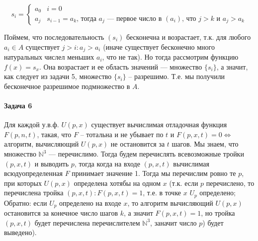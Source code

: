 \documentclass{article}
\newcommand{\andi}{$ и $}
\newcommand{\N}{\mathbb{N}}
\begin{document}
        \begin{equation*}
          s_i = 
          \begin{cases} 
            a_0 &\text{$i = 0$}\\
            a_j &\text{$s_{i - 1} = a_k$, тогда $a_j$ --- первое число в $(a_i)$, что $j > k \andi a_j > a_k$}
          \end{cases}
        \end{equation*} 

        Поймем, что последовательность $(s_i)$ бесконечна и возрастает, т.к. для любого $a_i \in A$ существует $j > i: a_j > a_i$ (иначе существует бесконечно много натуральных числел меньших $a_i$, что не так). Но тогда рассмотрим функцию $f(x) = s_x$. Она возрастает и ее область значений --- множество $\{s_i\}$, а значит, как следует из задачи 5, множество $\{s_i\}$ -- разрешимо. Т.е. мы получили бесконечное разрешимое подмножество в $A$.
	
    \paragraph{Задача 6}
    Для каждой у.в.ф. $U(p, x)$ существует вычислимая отладочная функция $F(p, n, t)$, такая, что $F$ -- тотальна и не убывает по $t$ и $F(p, x, t) = 0 \Leftrightarrow $ алгоритм, вычисляющий $U(p, x)$ не остановится за $t$ шагов. Мы знаем, что множество $\N^3$ --- перечислимо. Тогда будем перечислять всевозможные тройки $(p, x, t)$ и выводить $p$, тогда когда на входе $(p, x, t)$ вычислимая всюдуопределенная $F$ принимает значение 1. Тогда мы перечислим ровно те $p$, при которых $U(p, x)$ определена хотябы на одном $x$ (т.к. если $p$ перечислено, то перечислена тройка $(p,x,t): F(p,x,t) = 1$, т.е. в точке $x$ $U_p$ определено; Обратно: если $U_p$ определено на входе $x$, то алгоритм вычисляющий $U(p, x)$ остановится за конечное число шагов $k$, а значит $F(p, x, t)=1$, но тройка $(p, x, t)$ будет перечислена перечислителем $\N^3$, заначит число $p$) будет выведено).
\end{document}
